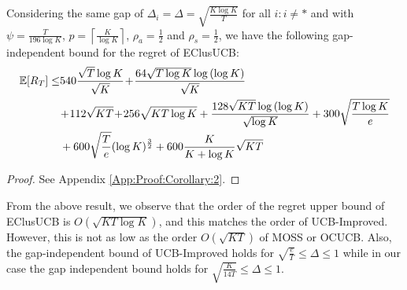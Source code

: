 \begin{corollary}
\label{Result:Corollary:2}
Considering the same gap of $\Delta_{i} = \Delta =\sqrt{\frac{K\log K}{T}}$ for all ${i:i\neq *}$ and with $\psi=\frac{T}{196 \log K}$, $p=\left\lceil\frac{K}{\log K}\right\rceil$, $\rho_{a}=\frac{1}{2}$ and $\rho_{s}=\frac{1}{2}$, 
 we have the following gap-independent bound for the regret of EClusUCB:
\begin{align*}
 \mathbb{E}[R_{T}]\le & 540\frac{\sqrt{T}\log K}{\sqrt{K}} \!+\! \frac{64\sqrt{T\log K}\log{(\log K)}}{\sqrt{K}}\\
  &\!+\! 112\sqrt{KT} \!+\! 256\sqrt{KT\log K}
	 + \frac{128\sqrt{KT}\log{(\log K)}}{\sqrt{\log K}} + 300\sqrt{\frac{T\log K}{e}}\\
	& + 600\sqrt{\frac{T}{e}}(\log K)^{\frac{3}{2}} + 600 \frac{K}{K+\log K}\sqrt{KT}
\end{align*}
\end{corollary}
\begin{proof}
 See Appendix \ref{App:Proof:Corollary:2}.
\end{proof}


From the above result, we observe that the order of the regret upper bound of EClusUCB is $O(\sqrt{KT\log K})$, and this matches the order of UCB-Improved. However, this is not as low as the order $O(\sqrt{KT})$ of MOSS or OCUCB. Also, the gap-independent bound of UCB-Improved holds for $ \sqrt{\frac{e}{T}} \leq \Delta \leq 1$ while in our case the gap independent bound holds for $\sqrt{\frac{K}{14T}} \leq \Delta \leq 1$.

% 
%
%
%
%
%
